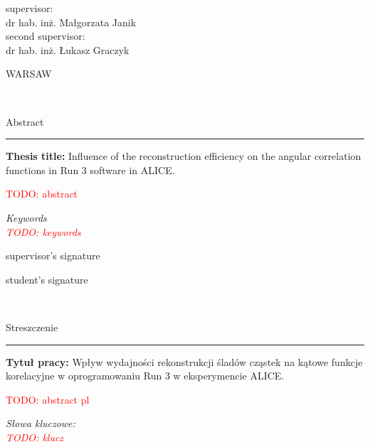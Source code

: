 \documentclass[11pt,a4paper,twoside]{book}
\numberwithin{equation}{chapter}
\newcommand{\todo}[1]{\textcolor{red}{TODO: #1}}
\newcommand{\thesistitle}{Influence of the reconstruction efficiency on the angular correlation functions in Run 3 software in ALICE.}
\newcommand{\thesistitlepl}{Wpływ wydajności rekonstrukcji śladów cząstek na kątowe funkcje korelacyjne w oprogramowaniu Run 3 w eksperymencie ALICE.}
\begin{document}
\begin{titlepage}
	\vspace{1.5cm}
	
	\begin{minipage}{\textwidth}
		\begin{center}
			{\large supervisor: \\
				dr hab. inż. Małgorzata Janik}\\
			\vspace{0.5cm}
			{\large second supervisor: \\
				dr hab. inż. Łukasz Graczyk}
		\end{center}
	\end{minipage}%
	
	\vfill
	
	\begin{minipage}[b]{\textwidth}
		\begin{center}
			{\large WARSAW \the\year{}}
		\end{center}
	\end{minipage}
\end{titlepage}

\newpage
\mbox{ }

\newpage
{\Large Abstract}\\
{\color{sliwka}\rule[1pt]{\textwidth}{2pt}}

\textbf{Thesis title:} \thesistitle

\todo{abstract}

\vspace{0.025\textheight}
\textit{Keywords}\\
\textit{\todo{keywords}}

\vfill

\begin{multicols}{2}
	\begin{flushleft}
		supervisor's signature
	\end{flushleft}
	\begin{flushright}
		student's signature
	\end{flushright}
\end{multicols}

\newpage
\mbox{ }

\newpage
{\Large Streszczenie}\\
{\color{sliwka}\rule[1pt]{\textwidth}{2pt}}

\textbf{Tytuł pracy:} \thesistitlepl

\todo{abstract pl}

\vspace{0.025\textheight}
\textit{Słowa kluczowe:}\\
\textit{\todo{klucz}}
\end{document}
